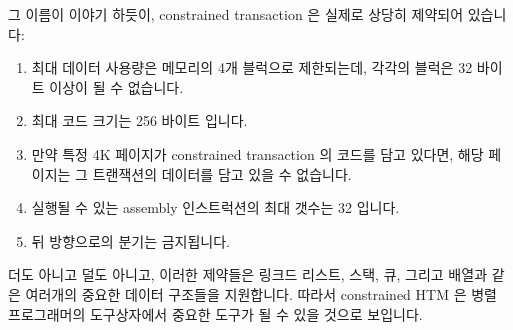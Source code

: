 그 이름이 이야기 하듯이, constrained transaction 은 실제로 상당히 제약되어
있습니다:
\iffalse

The Mainframe architects needed to take extreme measures to deliver on
this forward-progress guarantee.
If a given constrained transaction repeatedly fails, the CPU
might disable branch prediction, force in-order execution, and even
disable pipelining.
If the repeated failures are due to high contention, the CPU might
disable speculative fetches, introduce random delays, and even
serialize execution of the conflicting CPUs.
``Interesting'' forward-progress scenarios involve as few as two CPUs
or as many as one hundred CPUs.
Perhaps these extreme measures provide some insight as to why other CPUs
have thus far refrained from offering constrained transactions.

As the name implies, constrained transactions are in fact severely constrained:
\fi

\begin{enumerate}
\item	최대 데이터 사용량은 메모리의 4개 블럭으로 제한되는데, 각각의 블럭은 32
	바이트 이상이 될 수 없습니다.
\item	최대 코드 크기는 256 바이트 입니다.
\item	만약 특정 4K 페이지가 constrained transaction 의 코드를 담고 있다면,
	해당 페이지는 그 트랜잭션의 데이터를 담고 있을 수 없습니다.
\item	실행될 수 있는 assembly 인스트럭션의 최대 갯수는 32 입니다.
\item	뒤 방향으로의 분기는 금지됩니다.
\iffalse

\item	The maximum data footprint is four blocks of memory,
	where each block can be no larger than 32 bytes.
\item	The maximum code footprint is 256 bytes.
\item	If a given 4K page contains a constrained transaction's code,
	then that page may not contain that transaction's data.
\item	The maximum number of assembly instructions that may be executed
	is 32.
\item	Backwards branches are forbidden.
\fi
\end{enumerate}

더도 아니고 덜도 아니고, 이러한 제약들은 링크드 리스트, 스택, 큐, 그리고 배열과
같은 여러개의 중요한 데이터 구조들을 지원합니다.
따라서 constrained HTM 은 병렬 프로그래머의 도구상자에서 중요한 도구가 될 수
있을 것으로 보입니다.

